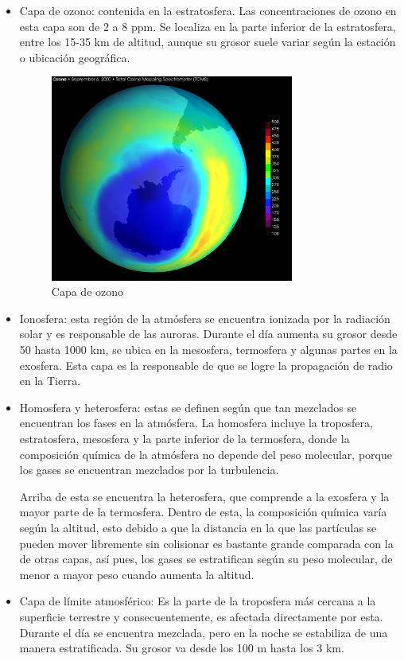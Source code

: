 \documentclass{article}
\begin{document}
\begin{itemize}
\item Capa de ozono: contenida en la estratosfera. Las concentraciones de ozono en esta capa son de 2 a 8 ppm. Se localiza en la parte inferior de la estratosfera, entre los 15-35 km de altitud, aunque su grosor suele variar según la estación o ubicación geográfica.
\begin{figure}[h!]
  \includegraphics[width=8cm]{3.jpg}
  \centering
  \caption{Capa de ozono}
  \label{fig:3}
\end{figure}

\item Ionosfera: esta región de la atmósfera se encuentra ionizada por la radiación solar y es responsable de las auroras. Durante el día aumenta su grosor desde 50 hasta 1000 km, se ubica en la mesosfera, termosfera y algunas partes en la exosfera. Esta capa es la responsable de que se logre la propagación de radio en la Tierra.

\item Homosfera y heterosfera: estas se definen según que tan mezclados se encuentran los fases en la atmósfera. La homosfera incluye la troposfera, estratosfera, mesosfera y la parte inferior de la termosfera, donde la composición química de la atmósfera no depende del peso molecular, porque los gases se encuentran mezclados por la turbulencia. 

Arriba de esta se encuentra la heterosfera, que comprende a la exosfera y la mayor parte de la termosfera. Dentro de esta, la composición química varía según la altitud, esto debido a que la distancia en la que las partículas se pueden mover libremente sin colisionar es bastante grande comparada con la de otras capas, así pues, los gases se estratifican según su peso molecular, de menor a mayor peso cuando aumenta la altitud. 

\item Capa de límite atmosférico: Es la parte de la troposfera más cercana a la superficie terrestre y consecuentemente, es afectada directamente por esta. Durante el día se encuentra mezclada, pero en la noche se estabiliza de una manera estratificada. Su grosor va desde los 100 m hasta los 3 km. 
\end{itemize}
\end{document}

